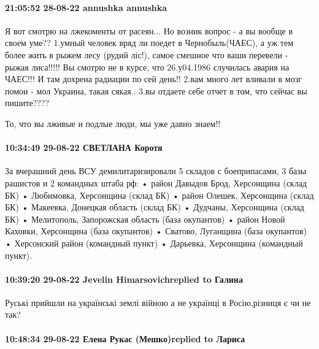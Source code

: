 \paragraph{21:05:52 28-08-22 annushka annushka}

Я вот смотрю на лжекоменты от расеян... Но возник вопрос - а вы вообще в своем уме??
1.умный человек вряд ли поедет в Чернобыль(ЧАЕС), а уж тем более жить в рыжем лесу (рудий ліс!), самое смешное что ваши перевели - рыжая лиса!!!!! Вы смотрю не в курсе, что 26.у04.1986 случилась авария на ЧАЕС!!! И там дохрена радиации по сей день!!
2.вам много лет вливали в мозг помои - мол Украина, такая сякая..
3.вы отдаете себе отчет в том, что сейчас вы пишите????

То, что вы лживые и подлые люди, мы уже давно знаем!!



\paragraph{10:34:49 29-08-22 СВЕТЛАНА Коротя}

За вчерашний день ВСУ демилитаризировали 5 складов с боеприпасами, 3 базы рашистов и 2 командных штаба рф:
• район Давыдов Брод, Херсонщина (склад БК)
• Любимовка, Херсонщина (склад БК)
• район Олешек, Херсонщина (склад БК)
• Макеевка, Донецкая область (склад БК)
• Дудчаны, Херсонщина (склад БК)
• Мелитополь, Запорожская область (база окупантов)
• район Новой Каховки, Херсонщина (база окупантов)
• Сватово, Луганщина (база окупантов)
• Херсонский район (командный пункт)
• Дарьевка, Херсонщина (командный пункт).

\paragraph{10:39:20 29-08-22 Jevelin Himarsovichreplied to Галина}

Руські прийшли на українські землі війною а не українці в Росію,різниця є чи не
так?

\paragraph{10:48:34 29-08-22 Елена Рукас (Мешко)replied to Лариса}

